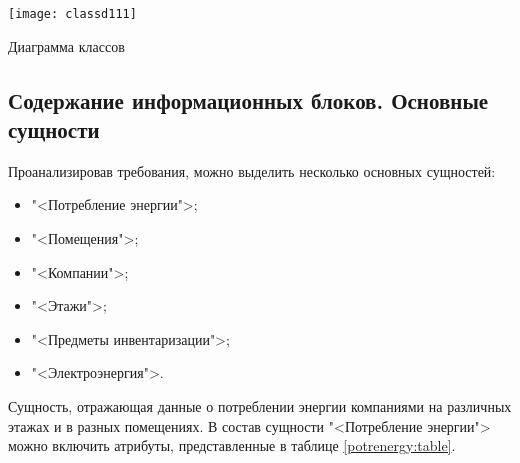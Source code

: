\begin{landscape}
	
	\begin{плакат}
		\texttt{[image: classd111]}
		\caption{Диаграмма классов}
		\label{classd111:image}      
	\end{плакат}
\end{landscape}



\newpage

\subsection{Содержание информационных блоков. Основные сущности}

Проанализировав требования, можно выделить несколько основных сущностей:

\begin{itemize}
	\item "<Потребление энергии">;
	\item "<Помещения">;
	\item "<Компании">;
	\item "<Этажи">;
	\item "<Предметы инвентаризации">;
	\item "<Электроэнергия">.
\end{itemize}

Сущность, отражающая данные о потреблении энергии компаниями на различных этажах и в разных помещениях. В состав сущности "<Потребление энергии"> можно включить атрибуты, представленные в таблице \ref{potrenergy:table}.

